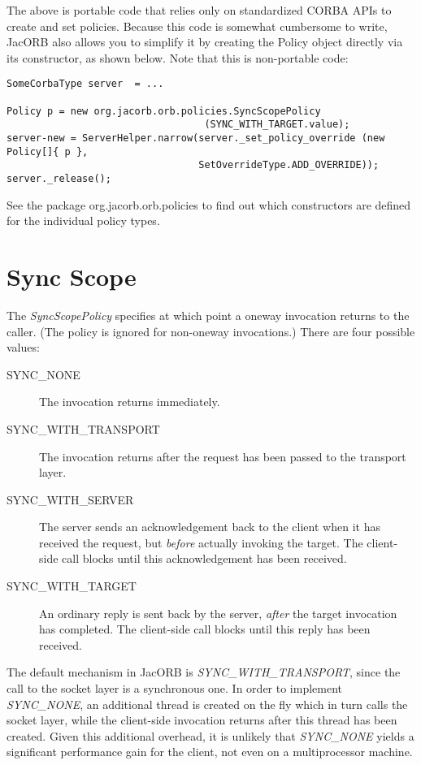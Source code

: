 The above is portable code that relies only on standardized CORBA APIs
to create and set policies.  Because this code is somewhat cumbersome
to write, JacORB also allows you to simplify it by creating the Policy
object directly via its constructor, as shown below. Note that this is
non-portable code:

\begin{verbatim}
SomeCorbaType server  = ...

Policy p = new org.jacorb.orb.policies.SyncScopePolicy
                                  (SYNC_WITH_TARGET.value);
server-new = ServerHelper.narrow(server._set_policy_override (new Policy[]{ p },
                                 SetOverrideType.ADD_OVERRIDE));
server._release();
\end{verbatim}

See the package org.jacorb.orb.policies to find out which
constructors are defined for the individual policy types.

\section{Sync Scope}

The \emph{SyncScopePolicy} specifies at which point a oneway
invocation returns to the caller.  (The policy is ignored for
non-oneway invocations.)  There are four possible
values:

\begin{description}
\item[SYNC\_NONE] The invocation returns immediately.
\item[SYNC\_WITH\_TRANSPORT] The invocation returns after the request
  has been passed to the transport layer.
\item[SYNC\_WITH\_SERVER] The server sends an
  acknowledgement back to the client when it has received the
  request, but \emph{before} actually invoking the target.  The
  client-side call blocks until this acknowledgement has been
  received.
\item[SYNC\_WITH\_TARGET] An ordinary reply is sent back by the
  server, \emph{after} the target invocation has completed.  The
  client-side call blocks until this reply has been received.
\end{description}

The default mechanism in JacORB is \emph{SYNC\_WITH\_TRANSPORT},
since the call to the socket layer is a synchronous one.  In order to
implement \emph{SYNC\_NONE}, an additional thread is created on the
fly which in turn calls the socket layer, while the client-side
invocation returns after this thread has been created.  Given this
additional overhead, it is unlikely that \emph{SYNC\_NONE} yields a
significant performance gain for the client, not even on a
multiprocessor machine.

